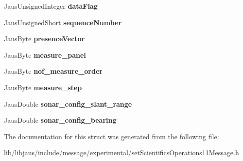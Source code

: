 \begin{DoxyCompactItemize}
\item 
\hypertarget{struct_set_scientifics_operations11_message_struct_a0c4de1b333c1c11e7f4a2fb52e095621}{\-Jaus\-Unsigned\-Integer {\bfseries data\-Flag}}\label{struct_set_scientifics_operations11_message_struct_a0c4de1b333c1c11e7f4a2fb52e095621}

\item 
\hypertarget{struct_set_scientifics_operations11_message_struct_ae050b1b773afb9d55f07609f0486098a}{\-Jaus\-Unsigned\-Short {\bfseries sequence\-Number}}\label{struct_set_scientifics_operations11_message_struct_ae050b1b773afb9d55f07609f0486098a}

\item 
\hypertarget{struct_set_scientifics_operations11_message_struct_ad47e2f4d4e7b3c2b496d07215f5a36bd}{\-Jaus\-Byte {\bfseries presence\-Vector}}\label{struct_set_scientifics_operations11_message_struct_ad47e2f4d4e7b3c2b496d07215f5a36bd}

\item 
\hypertarget{struct_set_scientifics_operations11_message_struct_a4d9b4184e9088e5cebb614f34433168c}{\-Jaus\-Byte {\bfseries measure\-\_\-panel}}\label{struct_set_scientifics_operations11_message_struct_a4d9b4184e9088e5cebb614f34433168c}

\item 
\hypertarget{struct_set_scientifics_operations11_message_struct_a16bec6a56bb321eea019bbbedea7d9b2}{\-Jaus\-Byte {\bfseries nof\-\_\-measure\-\_\-order}}\label{struct_set_scientifics_operations11_message_struct_a16bec6a56bb321eea019bbbedea7d9b2}

\item 
\hypertarget{struct_set_scientifics_operations11_message_struct_a132ccf2531fa4a094c944440620c9ccb}{\-Jaus\-Byte {\bfseries measure\-\_\-step}}\label{struct_set_scientifics_operations11_message_struct_a132ccf2531fa4a094c944440620c9ccb}

\item 
\hypertarget{struct_set_scientifics_operations11_message_struct_a3bfd8dc02ff76216b39b1361001a10f4}{\-Jaus\-Double {\bfseries sonar\-\_\-config\-\_\-slant\-\_\-range}}\label{struct_set_scientifics_operations11_message_struct_a3bfd8dc02ff76216b39b1361001a10f4}

\item 
\hypertarget{struct_set_scientifics_operations11_message_struct_af736e23354c7bd45a9132a136799dad1}{\-Jaus\-Double {\bfseries sonar\-\_\-config\-\_\-bearing}}\label{struct_set_scientifics_operations11_message_struct_af736e23354c7bd45a9132a136799dad1}

\end{DoxyCompactItemize}


\-The documentation for this struct was generated from the following file\-:\begin{DoxyCompactItemize}
\item 
lib/libjaus/include/message/experimental/set\-Scientifics\-Operations11\-Message.\-h\end{DoxyCompactItemize}
